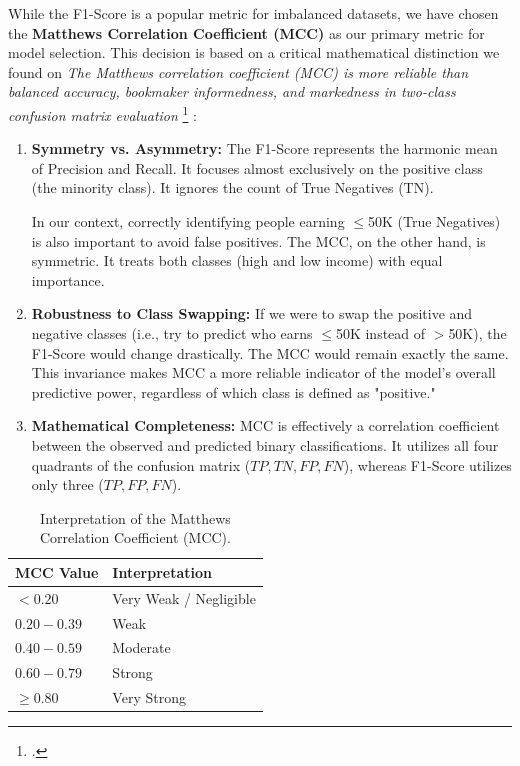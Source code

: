 While the F1-Score is a popular metric for imbalanced datasets, we have chosen the \textbf{Matthews Correlation Coefficient (MCC)} as our primary metric for model selection. This decision is based on a critical mathematical distinction we found on
\textit{The Matthews correlation coefficient
(MCC) is more reliable than balanced
accuracy, bookmaker informedness, and
markedness in two-class confusion matrix
evaluation} \footcite{Chicco2021} :
\begin{enumerate}
    \item \textbf{Symmetry vs. Asymmetry:} 
    The F1-Score represents the harmonic mean of Precision and Recall. It focuses almost exclusively on the positive class (the minority class). It ignores the count of True Negatives (TN). 
    
    In our context, correctly identifying people earning $\le$50K (True Negatives) is also important to avoid false positives. The MCC, on the other hand, is symmetric. It treats both classes (high and low income) with equal importance.
    
    \item \textbf{Robustness to Class Swapping:} 
    If we were to swap the positive and negative classes (i.e., try to predict who earns $\le$50K instead of $>$50K), the F1-Score would change drastically. The MCC would remain exactly the same. This invariance makes MCC a more reliable indicator of the model's overall predictive power, regardless of which class is defined as "positive."
    
    \item \textbf{Mathematical Completeness:} 
    MCC is effectively a correlation coefficient between the observed and predicted binary classifications. It utilizes all four quadrants of the confusion matrix ($TP, TN, FP, FN$), whereas F1-Score utilizes only three ($TP, FP, FN$).
\end{enumerate}

\begin{table}[h]
    \centering
    \begin{tabular}{|l|l|}
        \toprule
        \textbf{MCC Value} & \textbf{Interpretation} \\
        \midrule
        $< 0.20$      & Very Weak / Negligible \\
        $0.20 - 0.39$ & Weak \\
        $0.40 - 0.59$ & Moderate \\
        $0.60 - 0.79$ & Strong \\
        $\ge 0.80$    & Very Strong \\
        \bottomrule
    \end{tabular}
    \label{tab:mcc_interpretation}
    \caption{Interpretation of the Matthews Correlation Coefficient (MCC).}
\end{table}



